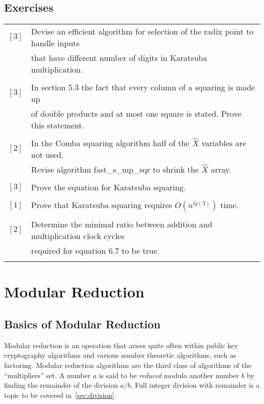 \documentclass[b5paper]{book}
\begin{document}
\section*{Exercises}
\begin{tabular}{cl}
$\left [ 3 \right ] $ & Devise an efficient algorithm for selection of the radix point to handle inputs \\
                      & that have different number of digits in Karatsuba multiplication. \\
                      & \\
$\left [ 3 \right ] $ & In section 5.3 the fact that every column of a squaring is made up \\
                      & of double products and at most one square is stated.  Prove this statement. \\
                      & \\                      
$\left [ 2 \right ] $ & In the Comba squaring algorithm half of the $\hat X$ variables are not used. \\
                      & Revise algorithm fast\_s\_mp\_sqr to shrink the $\hat X$ array. \\
                      & \\
$\left [ 3 \right ] $ & Prove the equation for Karatsuba squaring. \\
                      & \\
$\left [ 1 \right ] $ & Prove that Karatsuba squaring requires $O \left (n^{lg(3)} \right )$ time. \\
                      & \\ 
$\left [ 2 \right ] $ & Determine the minimal ratio between addition and multiplication clock cycles \\
                      & required for equation $6.7$ to be true.  \\
                      & \\
\end{tabular}

\chapter{Modular Reduction}
\section{Basics of Modular Reduction}
Modular reduction is an operation that arises quite often within public key cryptography algorithms and various number theoretic algorithms, 
such as factoring.  Modular reduction algorithms are the third class of algorithms of the ``multipliers'' set.  A number $a$ is said to be \textit{reduced}
modulo another number $b$ by finding the remainder of the division $a/b$.  Full integer division with remainder is a topic to be covered 
in~\ref{sec:division}.
\end{document}

